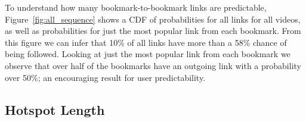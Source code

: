 \documentclass[a4paper,11pt]{article}
\begin{document}
To understand how many bookmark-to-bookmark links are predictable, Figure~\ref{fig:all_sequence} shows a CDF of probabilities for all links for all videos, as well as probabilities for just the most popular link from each bookmark. From this figure we can infer that 10\% of all links have more than a 58\% chance of being followed. %
Looking at just the most popular link from each bookmark we observe that over half of the bookmarks have an outgoing link with a probability over 50\%; an encouraging result for user predictability.




\subsection{Hotspot Length}
\label{sect:hotspot_length}
\end{document}

